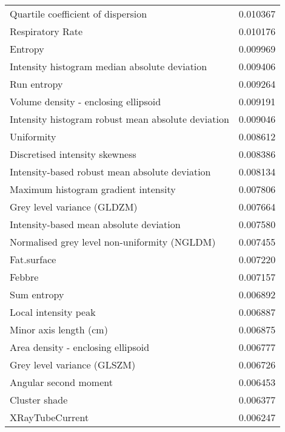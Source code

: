 \begin{longtable}{|lr|}
Quartile coefficient of dispersion                 &        0.010367 \\
Respiratory Rate                                   &        0.010176 \\
Entropy                                            &        0.009969 \\
Intensity histogram median absolute deviation      &        0.009406 \\
Run entropy                                        &        0.009264 \\
Volume density - enclosing ellipsoid               &        0.009191 \\
Intensity histogram robust mean absolute deviation &        0.009046 \\
Uniformity                                         &        0.008612 \\
Discretised intensity skewness                     &        0.008386 \\
Intensity-based robust mean absolute deviation     &        0.008134 \\
Maximum histogram gradient intensity               &        0.007806 \\
Grey level variance (GLDZM)                        &        0.007664 \\
Intensity-based mean absolute deviation            &        0.007580 \\
Normalised grey level non-uniformity (NGLDM)       &        0.007455 \\
Fat.surface                                        &        0.007220 \\
Febbre                                             &        0.007157 \\
Sum entropy                                        &        0.006892 \\
Local intensity peak                               &        0.006887 \\
Minor axis length (cm)                             &        0.006875 \\
Area density - enclosing ellipsoid                 &        0.006777 \\
Grey level variance (GLSZM)                        &        0.006726 \\
Angular second moment                              &        0.006453 \\
Cluster shade                                      &        0.006377 \\
XRayTubeCurrent                                    &        0.006247 \\

\end{longtable}
